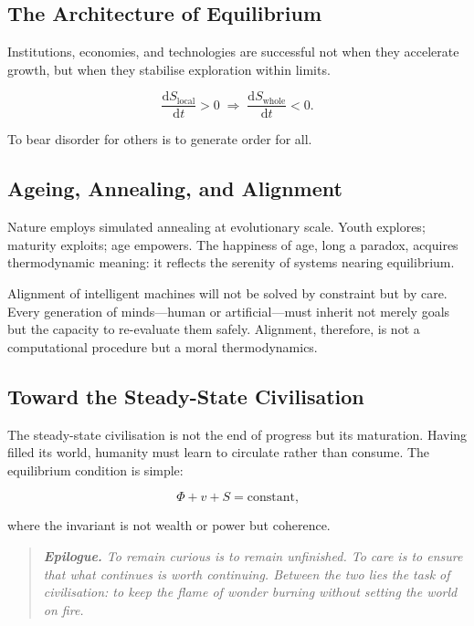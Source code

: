 \documentclass[12pt,a4paper]{article}
\theoremstyle{definition}
\newcommand{\ddt}[1]{\frac{\mathrm{d}#1}{\mathrm{d}t}}
\begin{document}
\subsection{The Architecture of Equilibrium}

Institutions, economies, and technologies are successful not when they
accelerate growth, but when they stabilise exploration within limits.

\begin{equation}
  \ddt{S_{\mathrm{local}}} > 0
  \;\Longrightarrow\;
  \ddt{S_{\mathrm{whole}}} < 0.
\end{equation}

To bear disorder for others is to generate order for all.

\subsection{Ageing, Annealing, and Alignment}

Nature employs simulated annealing at evolutionary scale.  Youth explores;
maturity exploits; age empowers.  The happiness of age, long a paradox,
acquires thermodynamic meaning: it reflects the serenity of systems nearing
equilibrium.

Alignment of intelligent machines will not be solved by constraint but by
care.  Every generation of minds---human or artificial---must inherit not
merely goals but the capacity to re-evaluate them safely.  Alignment,
therefore, is not a computational procedure but a moral thermodynamics.

\subsection{Toward the Steady-State Civilisation}

The steady-state civilisation is not the end of progress but its maturation.
Having filled its world, humanity must learn to circulate rather than consume.
The equilibrium condition is simple:

\begin{equation}
  \Phi + v + S = \text{constant,}
\end{equation}

where the invariant is not wealth or power but coherence.

\medskip
\begin{quote}
  \itshape
  \textbf{Epilogue.} To remain curious is to remain unfinished.  To care is
  to ensure that what continues is worth continuing.  Between the two lies
  the task of civilisation: to keep the flame of wonder burning without
  setting the world on fire.
\end{quote}
\end{document}
